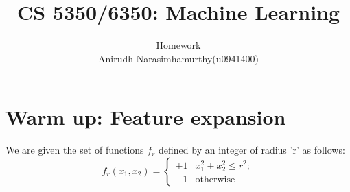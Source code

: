 \documentclass[12pt, fullpage,letterpaper]{article}
\title{CS 5350/6350: Machine Learning \semester}
\author{Homework \assignmentId   \\           
	 Anirudh Narasimhamurthy(u0941400)}
\begin{document}
\maketitle

\section{Warm up: Feature expansion}

We are given the set of functions $f_r$ defined by an integer of radius 'r' as follows:
\begin{equation}
f_r(x_1, x_2) = \left\{
\begin{array}{rl}
+1 & x_1^2 + x_2^2 \leq r^2;\\
-1 & \mbox{otherwise}
\end{array}
\right.
\label{eq:f_r}
\end{equation}
\end{document}

